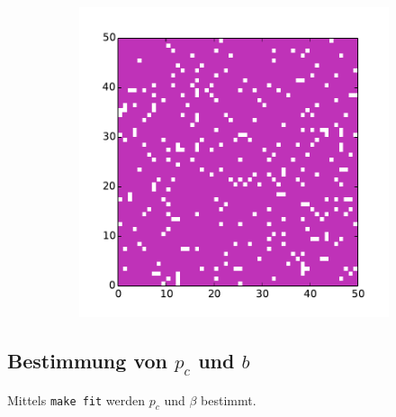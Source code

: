 \documentclass{scrartcl}
\begin{document}
\begin{figure}[H]
\begin{subfigure}{.31\textwidth}
    \end{subfigure}
    \begin{subfigure}{.31\textwidth}
        \centering
        \includegraphics[width=\textwidth]{plots/50-09.pdf}
    \end{subfigure}
\end{figure}

\newpage

\subsection*{Bestimmung von $p_c$ und $b$}

Mittels \texttt{make fit} werden $p_c$ und $\beta$ bestimmt.
\end{document}
